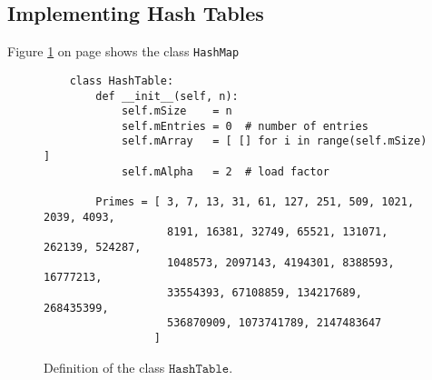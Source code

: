 \subsection{Implementing Hash Tables}

Figure \ref{fig:HashMap.ipynb} on page \pageref{fig:HashMap.ipynb} shows the class \texttt{HashMap}

\begin{figure}[!ht]
  \centering
\begin{verbatim}
    class HashTable:
        def __init__(self, n):
            self.mSize    = n
            self.mEntries = 0  # number of entries
            self.mArray   = [ [] for i in range(self.mSize) ]
            self.mAlpha   = 2  # load factor
        
        Primes = [ 3, 7, 13, 31, 61, 127, 251, 509, 1021, 2039, 4093, 
                   8191, 16381, 32749, 65521, 131071, 262139, 524287, 
                   1048573, 2097143, 4194301, 8388593, 16777213, 
                   33554393, 67108859, 134217689, 268435399, 
                   536870909, 1073741789, 2147483647 
                 ]
\end{verbatim}
\vspace*{-0.3cm}
  \caption{Definition of the class $\texttt{HashTable}$.}
  \label{fig:HashMap.ipynb}
\end{figure}


